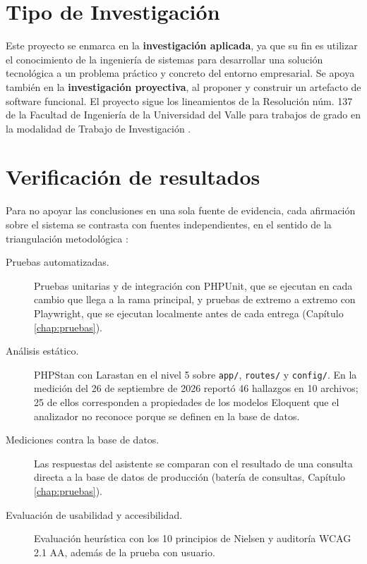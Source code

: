


\section{Tipo de Investigación}
\label{sec:tipo_investigacion}
Este proyecto se enmarca en la \textbf{investigación aplicada}, ya que su fin es utilizar el conocimiento de la ingeniería de sistemas para desarrollar una solución tecnológica a un problema práctico y concreto del entorno empresarial. Se apoya también en la \textbf{investigación proyectiva}, al proponer y construir un artefacto de software funcional. El proyecto sigue los lineamientos de la Resolución núm. 137 de la Facultad de Ingeniería de la Universidad del Valle para trabajos de grado en la modalidad de Trabajo de Investigación \cite{univalle_resolucion137}.

\section{Verificación de resultados}
\label{sec:triangulacion}

Para no apoyar las conclusiones en una sola fuente de evidencia, cada afirmación sobre el sistema se contrasta con fuentes independientes, en el sentido de la triangulación metodológica \cite{denzin_creswell}:

\begin{description}
    \item[Pruebas automatizadas.] Pruebas unitarias y de integración con PHPUnit, que se ejecutan en cada cambio que llega a la rama principal, y pruebas de extremo a extremo con Playwright, que se ejecutan localmente antes de cada entrega (Capítulo \ref{chap:pruebas}).
    \item[Análisis estático.] PHPStan con Larastan en el nivel 5 sobre \texttt{app/}, \texttt{routes/} y \texttt{config/}. En la medición del 26 de septiembre de 2026 reportó 46 hallazgos en 10 archivos; 25 de ellos corresponden a propiedades de los modelos Eloquent que el analizador no reconoce porque se definen en la base de datos.
    \item[Mediciones contra la base de datos.] Las respuestas del asistente se comparan con el resultado de una consulta directa a la base de datos de producción (batería de consultas, Capítulo \ref{chap:pruebas}).
    \item[Evaluación de usabilidad y accesibilidad.] Evaluación heurística con los 10 principios de Nielsen y auditoría WCAG 2.1 AA, además de la prueba con usuario.
\end{description}

